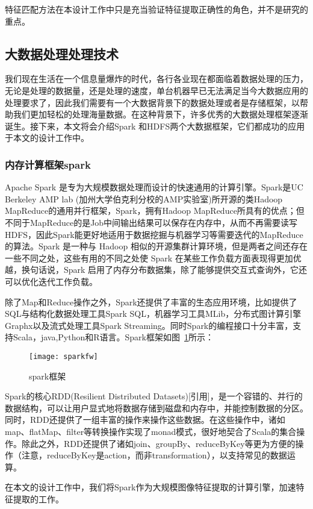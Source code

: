特征匹配方法在本设计工作中只是充当验证特征提取正确性的角色，并不是研究的重点。

\subsection{大数据处理处理技术}
我们现在生活在一个信息量爆炸的时代，各行各业现在都面临着数据处理的压力，无论是处理的数据量，还是处理的速度，单台机器早已无法满足当今大数据应用的处理要求了，因此我们需要有一个大数据背景下的数据处理或者是存储框架，以帮助我们更加轻松的处理海量数据。在这种背景下，许多优秀的大数据处理框架逐渐诞生。接下来，本文将会介绍Spark 和HDFS两个大数据框架，它们都成功的应用于本文的设计工作中。
\subsubsection{内存计算框架spark}
Apache Spark 是专为大规模数据处理而设计的快速通用的计算引擎。Spark是UC Berkeley AMP lab (加州大学伯克利分校的AMP实验室)所开源的类Hadoop MapReduce的通用并行框架，Spark，拥有Hadoop MapReduce所具有的优点；但不同于MapReduce的是Job中间输出结果可以保存在内存中，从而不再需要读写HDFS，因此Spark能更好地适用于数据挖掘与机器学习等需要迭代的MapReduce的算法。Spark 是一种与 Hadoop 相似的开源集群计算环境，但是两者之间还存在一些不同之处，这些有用的不同之处使 Spark 在某些工作负载方面表现得更加优越，换句话说，Spark 启用了内存分布数据集，除了能够提供交互式查询外，它还可以优化迭代工作负载。

除了Map和Reduce操作之外，Spark还提供了丰富的生态应用环境，比如提供了SQL与结构化数据处理工具Spark SQL，机器学习工具MLib，分布式图计算引擎Graphx以及流式处理工具Spark Streaming。同时Spark的编程接口十分丰富，支持Scala，java,Python和R语言。Spark框架如图~\ref{fig:sparkfw}所示：
\begin{figure}[htp]
\centering
\texttt{[image: sparkfw]}
\caption{spark框架}
\label{fig:sparkfw}
\end{figure}

Spark的核心RDD(Resilient Distributed Datasets)[引用]，是一个容错的、并行的数据结构，可以让用户显式地将数据存储到磁盘和内存中，并能控制数据的分区。同时，RDD还提供了一组丰富的操作来操作这些数据。在这些操作中，诸如map、flatMap、filter等转换操作实现了monad模式，很好地契合了Scala的集合操作。除此之外，RDD还提供了诸如join、groupBy、reduceByKey等更为方便的操作（注意，reduceByKey是action，而非transformation），以支持常见的数据运算。

在本文的设计工作中，我们将Spark作为大规模图像特征提取的计算引擎，加速特征提取的工作。
